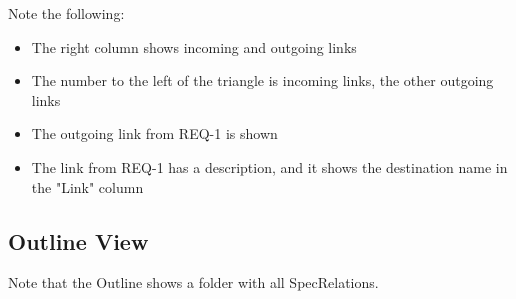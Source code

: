 Note the following:

\begin{itemize}
\item
  The right column shows incoming and outgoing links
\item
  The number to the left of the triangle is incoming links, the other outgoing links
\item
  The outgoing link from REQ-1 is shown
\item
  The link from REQ-1 has a description, and it shows the destination name in the "Link" column
\end{itemize}

\subsection{Outline View}

Note that the Outline shows a folder with all SpecRelations.

